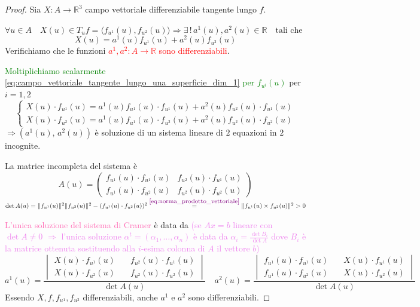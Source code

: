         \begin{proof}
        Sia $X \colon A \to \mathbb{R}^3$ campo vettoriale differenziabile tangente lungo $f$. 

        $\forall u \in A \quad X(u) \in T_u f= \langle f_{u^1}(u), f_{u^2}(u) \rangle \Rightarrow \exists \, ! \, a^1(u), a^2(u) \in \mathbb{R} \quad \text{tali che} $
        \begin{equation}
        \label{eq:campo_vettoriale_tangente_lungo_una_superficie_dim_1}
        X(u) = a^1(u) f_{u^1}(u) + a^2(u) f_{u^2}(u)
        \end{equation}
        Verifichiamo che le funzioni \textcolor{red}{$a^1, a^2 \colon A \to \mathbb{R}$ sono differenziabili}.

        \textcolor{green}{Moltiplichiamo scalarmente \eqref{eq:campo_vettoriale_tangente_lungo_una_superficie_dim_1} per $f_{u^i}(u)$} per $i=1,2$ 
        \[ \begin{cases*}
        X(u) \cdot f_{u^1}(u) = a^1(u) f_{u^1}(u) \cdot f_{u^1}(u) + a^2(u) f_{u^2}(u) \cdot f_{u^1}(u) \\
        X(u) \cdot f_{u^2}(u) = a^1(u) f_{u^1}(u) \cdot f_{u^2}(u) + a^2(u) f_{u^2}(u) \cdot f_{u^2}(u)
        \end{cases*} \]
        $\Rightarrow \left(a^1(u), \, a^2(u)\right)$ è soluzione di un sistema lineare di $2$ equazioni in $2$ incognite.

        La matrice incompleta del sistema è 
        \[ A(u) = \begin{pmatrix}
        f_{u^1}(u) \cdot f_{u^1}(u) & f_{u^2}(u) \cdot f_{u^1}(u) \\
        f_{u^1}(u) \cdot f_{u^2}(u) & f_{u^2}(u) \cdot f_{u^2}(u)
        \end{pmatrix} \]
        $\det A(u) = \lVert f_{u^1}(u)\rVert^2 \lVert f_{u^2}(u)\rVert^2 - (f_{u^1}(u) \cdot f_{u^2}(u))^2 \overset{\textcolor{violet}{\eqref{eq:norma_prodotto_vettoriale}}}{=} \lVert f_{u^1}(u) \times f_{u^2}(u)\rVert^2 >0$

        \textcolor{hotpink}{L'unica soluzione del sistema di Cramer} è data da \textcolor{violet}{(se $Ax=b$ lineare con $\det A \neq 0$
        $\Rightarrow$ l'unica soluzione $\alpha^t=(\alpha_1, \ldots , \alpha_n)$ è data da $\alpha_i=\frac{\det B_i}{\det A}$ dove
        $B_i$ è la matrice ottenuta sostituendo alla $i$-esima colonna di $A$ il vettore $b$)}
        \[ a^1(u) = \frac{ \begin{vmatrix}
        X(u) \cdot f_{u^1}(u) & \quad f_{u^2}(u) \cdot f_{u^1}(u) \\
        X(u) \cdot f_{u^2}(u) & \quad f_{u^2}(u) \cdot f_{u^2}(u)
        \end{vmatrix}}{\det A(u)} \quad
        a^2(u) = \frac{ \begin{vmatrix}
        f_{u^1}(u) \cdot f_{u^1}(u) & \quad X(u) \cdot f_{u^1}(u) \\
        f_{u^1}(u) \cdot f_{u^2}(u) & \quad X(u) \cdot f_{u^2}(u)
        \end{vmatrix}}{\det A(u)} \]
        Essendo $X,f, f_{u^1}, f_{u^2}$ differenziabili, anche $a^1$ e $a^2$ sono differenziabili.
        \end{proof}
